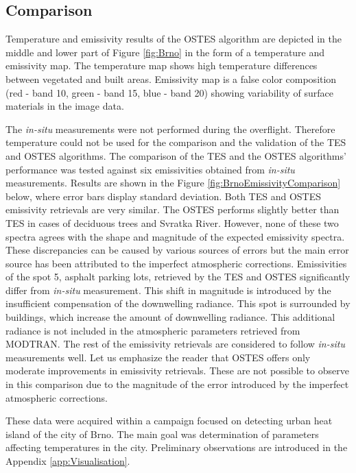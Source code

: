 \subsection*{Comparison}

Temperature and emissivity results of the OSTES algorithm are depicted in the middle and lower part of Figure \ref{fig:Brno} in the form of a temperature and emissivity map. The temperature map shows high temperature differences between vegetated and built areas. Emissivity map is a false color composition (red - band 10, green - band 15, blue - band 20) showing variability of surface materials in the image data.

\newpage
The \textit{in-situ} measurements were not performed during the overflight. Therefore temperature could not be used for the comparison and the validation of the TES and OSTES algorithms. The comparison of the TES and the OSTES algorithms' performance was tested against six emissivities obtained from \textit{in-situ} measurements. Results are shown in the Figure \ref{fig:BrnoEmissivityComparison} below, where error bars display standard deviation. Both TES and OSTES emissivity retrievals are very similar. The OSTES performs slightly better than TES in cases of deciduous trees and Svratka River. However, none of these two spectra agrees with the shape and magnitude of the expected emissivity spectra. These discrepancies can be caused by various sources of errors but the main error source has been attributed to the imperfect atmospheric corrections. Emissivities of the spot 5, asphalt parking lots, retrieved by the TES and OSTES significantly differ from \textit{in-situ} measurement. This shift in magnitude is introduced by the insufficient compensation of the downwelling radiance. This spot is surrounded by buildings, which increase the amount of downwelling radiance. This additional radiance is not included in the atmospheric parameters retrieved from MODTRAN. The rest of the emissivity retrievals are considered to follow \textit{in-situ} measurements well. Let us emphasize the reader that OSTES offers only moderate improvements in emissivity retrievals. These are not possible to observe in this comparison due to the magnitude of the error introduced by the imperfect atmospheric corrections. 

These data were acquired within a campaign focused on detecting urban heat island of the city of Brno. The main goal was determination of parameters affecting temperatures in the city. Preliminary observations are introduced in the Appendix \ref{app:Visualisation}.

